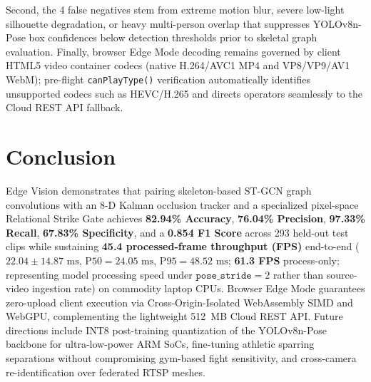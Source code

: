 \documentclass[conference]{IEEEtran}
\begin{document}
Second, the 4 false negatives stem from extreme motion blur, severe low-light silhouette degradation, or heavy multi-person overlap that suppresses YOLOv8n-Pose box confidences below detection thresholds prior to skeletal graph evaluation. Finally, browser Edge Mode decoding remains governed by client HTML5 video container codecs (native H.264/AVC1 MP4 and VP8/VP9/AV1 WebM); pre-flight \texttt{canPlayType()} verification automatically identifies unsupported codecs such as HEVC/H.265 and directs operators seamlessly to the Cloud REST API fallback.

\section{Conclusion}
Edge Vision demonstrates that pairing skeleton-based ST-GCN graph convolutions with an 8-D Kalman occlusion tracker and a specialized pixel-space Relational Strike Gate achieves \textbf{82.94\% Accuracy}, \textbf{76.04\% Precision}, \textbf{97.33\% Recall}, \textbf{67.83\% Specificity}, and a \textbf{0.854 F1 Score} across 293 held-out test clips while sustaining \textbf{45.4 processed-frame throughput (FPS)} end-to-end ($22.04 \pm 14.87\text{ ms}$, $\text{P50}=24.05\text{ ms}$, $\text{P95}=48.52\text{ ms}$; \textbf{61.3 FPS} process-only; representing model processing speed under $\texttt{pose\_stride}=2$ rather than source-video ingestion rate) on commodity laptop CPUs. Browser Edge Mode guarantees zero-upload client execution via Cross-Origin-Isolated WebAssembly SIMD and WebGPU, complementing the lightweight 512~MB Cloud REST API. Future directions include INT8 post-training quantization of the \mbox{YOLOv8n-Pose} backbone for ultra-low-power ARM SoCs, fine-tuning athletic sparring separations without compromising gym-based fight sensitivity, and cross-camera re-identification over federated RTSP meshes.
\end{document}
